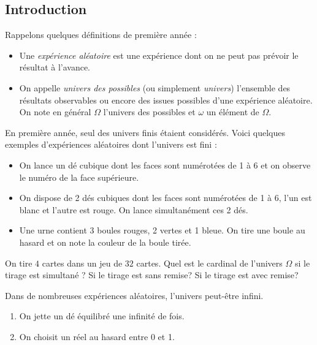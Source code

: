 \documentclass[french,11pt,twoside]{VcCours}
\begin{document}
\subsection{Introduction}
Rappelons quelques définitions de première année :
\begin{itemize}
 \item Une \emph{expérience aléatoire} est une expérience dont on ne peut pas prévoir le résultat à l'avance. 
 \item On appelle \emph{univers des possibles} (ou simplement \emph{univers}) 
 l'ensemble des résultats observables ou encore des issues possibles d'une expérience aléatoire. 
 On note en général $\Omega$ l'univers des possibles et $\omega$ un élément de $\Omega$.
\end{itemize}
En première année, seul des univers finis étaient considérés. Voici quelques exemples d'expériences aléatoires dont l'univers est fini :

\begin{itemize}
\item On lance un dé cubique dont les faces sont numérotées de 1 à 6 et on observe le numéro de la face supérieure.
\item On dispose de 2 dés cubiques dont les faces sont numérotées de 1 à 6,  l'un est blanc et l'autre est rouge. On lance simultanément ces 2 dés. 
\item Une urne contient 3 boules rouges, 2 vertes et 1 bleue. On tire une boule au hasard et on note la couleur de la boule tirée.
\end{itemize}

\begin{Exemple}
On tire $4$ cartes dans un jeu de $32$ cartes. Quel est le cardinal de l'univers $\Omega$ si le tirage est simultané ? Si le tirage est sans remise? Si le tirage est avec remise?

\vspace*{3cm}

\end{Exemple}


Dans de nombreuses expériences aléatoires, l'univers peut-être infini.



\begin{Exemples}
\begin{enumerate}
\item On jette un dé équilibré une infinité de fois.
\item On choisit un réel au hasard entre 0 et 1.
\end{enumerate}
\end{Exemples}
\end{document}
